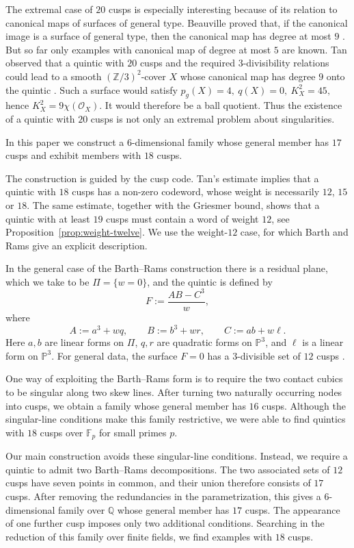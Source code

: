 \documentclass[10pt,a4paper]{article}
\begin{document}
The extremal case of $20$ cusps is especially interesting because of its relation to
canonical maps of surfaces of general type.  Beauville proved that, if the
canonical image is a surface of general type, then the canonical map has
degree at most $9$ \cite{Beauville_canonical}.  But so far only examples
with canonical map of degree at most $5$ are known.  Tan observed that a
quintic with $20$ cusps and the required $3$-divisibility relations could lead
to a smooth $\left(\mathbb Z/3\right)^2$-cover $X$ whose canonical map has
degree $9$ onto the quintic \cite{Tan_cusps}.  Such a surface would satisfy
$p_g(X)=4,\ q(X)=0,\ K_X^2=45,$ hence $K_X^2=9\chi(\mathcal O_X)$.
It would therefore be a ball quotient.  Thus the existence of a quintic with
$20$ cusps is not only an extremal problem about singularities.

In this paper we construct a $6$-dimensional family whose
general member has $17$ cusps and exhibit members with $18$ cusps.

The construction is guided by the cusp code.  Tan's estimate implies that a
quintic with $18$ cusps has a non-zero codeword, whose weight is necessarily
$12$, $15$ or $18$.  The same estimate, together with the Griesmer bound,
shows that a quintic with at least $19$ cusps must contain a word of weight
$12$, see Proposition~\ref{prop:weight-twelve}.  We use the weight-$12$ case,
for which Barth and Rams give an explicit description.

In the general case of the Barth--Rams construction there is a residual plane,
which we take to be
\(
\Pi=\{w=0\}
\),
and the quintic is defined by
\[
F:=\frac{AB-C^3}{w},
\]
where
\[
A:=a^3+wq,\qquad
B:=b^3+wr,\qquad
C:=ab+w\ell.
\]
Here $a,b$ are linear forms on $\Pi$, $q,r$ are quadratic forms on
$\mathbb P^3$, and $\ell$ is a linear form on $\mathbb P^3$. For general
data, the surface ${F=0}$ has a $3$-divisible set of $12$ cusps
\cite{BarthRams_equations}.

One way of exploiting the Barth--Rams form is to require the two contact
cubics to be singular along two skew lines.  After turning two naturally
occurring nodes into cusps, we obtain a family whose general member has $16$
cusps.  Although the singular-line conditions make this family restrictive,
we were able to find quintics with $18$ cusps over $\mathbb F_p$ for small
primes $p$.

Our main construction avoids these singular-line conditions.  Instead, we
require a quintic to admit two Barth--Rams decompositions.  The two associated
sets of $12$ cusps have seven points in common, and their union therefore
consists of $17$ cusps.  After removing the redundancies in the
parametrization, this gives a $6$-dimensional family over $\mathbb Q$ whose
general member has $17$ cusps.  The appearance of one further cusp imposes
only two additional conditions.  Searching in the reduction of this family
over finite fields, we find examples with $18$ cusps.
\end{document}
